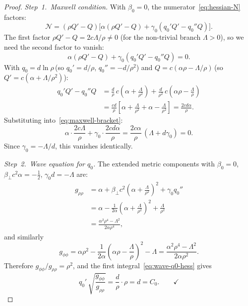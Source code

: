 \documentclass[pdflatex,sn-mathphys-num]{sn-jnl}
\theoremstyle{thmstyleone}%
\theoremstyle{thmstyletwo}%
\theoremstyle{thmstylethree}%
\numberwithin{equation}{section}
\begin{document}
\begin{proof}
\emph{Step~1.\ Maxwell condition.}
With $\beta_0 = 0$, the
numerator~\eqref{eq:hessian-N} factors:
\begin{equation}
\label{eq:N-factored}
\mathcal{N}
= (\rho Q'-Q)\bigl[\alpha(\rho Q'-Q)
  + \gamma_0(q_0' Q' - q_0'' Q)\bigr].
\end{equation}
The first factor $\rho Q'-Q = 2c\Lambda/\rho \neq 0$
(for the non-trivial branch $\Lambda > 0$), so we need
the second factor to vanish:
\begin{equation}
\label{eq:maxwell-bracket}
\alpha(\rho Q'-Q) + \gamma_0(q_0' Q' - q_0'' Q) = 0.
\end{equation}
With $q_0 = d\ln\rho$\,(so $q_0' = d/\rho$,
$q_0'' = -d/\rho^2$) and
$Q = c(\alpha\rho-\Lambda/\rho)$\,(so
$Q' = c(\alpha+\Lambda/\rho^2)$):
\begin{align*}
q_0' Q' - q_0'' Q
&= \frac{d}{\rho}\,c\!\left(\alpha+\frac{\Lambda}{\rho^2}\right)
  + \frac{d}{\rho^2}\,c\!\left(\alpha\rho
  - \frac{\Lambda}{\rho}\right) \\
&= \frac{cd}{\rho}\left[
  \alpha + \frac{\Lambda}{\rho^2}
  + \alpha - \frac{\Lambda}{\rho^2}\right]
= \frac{2cd\alpha}{\rho}.
\end{align*}
Substituting into~\eqref{eq:maxwell-bracket}:
\[
\alpha\cdot\frac{2c\Lambda}{\rho}
+ \gamma_0\cdot\frac{2cd\alpha}{\rho}
= \frac{2c\alpha}{\rho}\,(\Lambda + d\gamma_0) = 0.
\]
Since $\gamma_0 = -\Lambda/d$, this vanishes
identically.

\smallskip
\emph{Step~2.\ Wave equation for $q_0$.}
The extended metric components with $\beta_0 = 0$,
$\beta_\perp c^2 \alpha = -\tfrac{1}{2}$,
$\gamma_0 d = -\Lambda$ are:
\begin{align*}
g_{\rho\rho}
&= \alpha + \beta_\perp c^2\!\left(\alpha
  + \frac{\Lambda}{\rho^2}\right)^{\!2}
  + \gamma_0 q_0'' \\
&= \alpha - \frac{1}{2\alpha}\!\left(\alpha
  + \frac{\Lambda}{\rho^2}\right)^{\!2}
  + \frac{\Lambda}{\rho^2} \\
&= \frac{\alpha^2\rho^4 - \Lambda^2}{2\alpha\rho^4},
\end{align*}
and similarly
\[
g_{\phi\phi}
= \alpha\rho^2
  - \frac{1}{2\alpha}\!\left(\alpha\rho
  - \frac{\Lambda}{\rho}\right)^{\!2}
  - \Lambda
= \frac{\alpha^2\rho^4 - \Lambda^2}{2\alpha\rho^2}.
\]
Therefore $g_{\phi\phi}/g_{\rho\rho} = \rho^2$, and
the first integral~\eqref{eq:wave-q0-hess} gives
\[
q_0'\,\sqrt{\frac{g_{\phi\phi}}{g_{\rho\rho}}}
= \frac{d}{\rho}\cdot\rho = d = C_0. \qquad\checkmark
\]


\end{proof}
\end{document}
